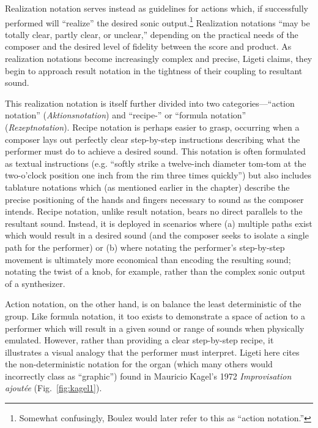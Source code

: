 
    Realization notation serves instead as guidelines for actions which, if successfully performed will ``realize'' the desired sonic output.\footnote{Somewhat confusingly, Boulez would later refer to this as ``action notation.''} Realization notations ``may be totally clear, partly clear, or unclear,'' depending on the practical needs of the composer and the desired level of fidelity between the score and product. As realization notations become increasingly complex and precise, Ligeti claims, they begin to approach result notation in the tightness of their coupling to resultant sound.\autocite[178]{Ligeti_1965}

    This realization notation is itself further divided into two categories---``action notation'' (\textit{Aktionsnotation}) and ``recipe-'' or ``formula notation'' (\textit{Rezeptnotation}). Recipe notation is perhaps easier to grasp, occurring when a composer lays out perfectly clear step-by-step instructions describing what the performer must do to achieve a desired sound. This notation is often formulated as textual instructions (e.g. ``softly strike a twelve-inch diameter tom-tom at the two-o'clock position one inch from the rim three times quickly'') but also includes tablature notations which (as mentioned earlier in the chapter) describe the precise positioning of the hands and fingers necessary to sound as the composer intends. Recipe notation, unlike result notation, bears no direct parallels to the resultant sound. Instead, it is deployed in scenarios where (a) multiple paths exist which would result in a desired sound (and the composer seeks to isolate a single path for the performer) or (b) where notating the performer's step-by-step movement is ultimately more economical than encoding the resulting sound; notating the twist of a knob, for example, rather than the complex sonic output of a synthesizer.

    Action notation, on the other hand, is on balance the least deterministic of the group. Like formula notation, it too exists to demonstrate a space of action to a performer which will result in a given sound or range of sounds when physically emulated. However, rather than providing a clear step-by-step recipe, it illustrates a visual analogy that the performer must interpret. Ligeti here cites the non-deterministic notation for the organ (which many others would incorrectly class as ``graphic'') found in Mauricio Kagel's 1972 \textit{Improvisation ajoutée} (Fig.~\ref{fig:kagel1}). 

